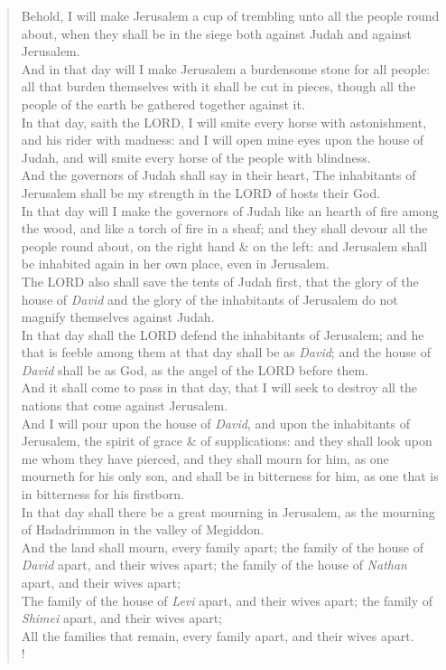 \documentclass[MAIN]{subfiles}
\begin{document}
\begin{verse}
Behold, I will make {\sc Jerusalem} a cup of trembling unto all the people round about, when they shall be in the siege both against Judah and against {\sc Jerusalem}.\\
And in that day will I make {\sc Jerusalem} a burdensome stone for all people: all that burden themselves with it shall be cut in pieces, though all the people of the earth be gathered together against it.\\
In that day, saith the {\hge LORD}, I will smite every horse with astonishment, and his rider with madness: and I will open mine eyes upon the house of Judah, and will smite every horse of the people with blindness.\\
And the governors of Judah shall say in their heart, The inhabitants of {\sc Jerusalem} shall be my strength in the {\hge LORD} of hosts their God.\\
In that day will I make the governors of Judah like an hearth of fire among the wood, and like a torch of fire in a sheaf; and they shall devour all the people round about, on the right hand \& on the left: and {\sc Jerusalem} shall be inhabited again in her own place, even in {\sc Jerusalem}.\\
The {\hge LORD} also shall save the tents of Judah first, that the glory of the house of \emph{David} and the glory of the inhabitants of {\sc Jerusalem} do not magnify themselves against Judah.\\
In that day shall the {\hge LORD} defend the inhabitants of {\sc Jerusalem}; and he that is feeble among them at that day shall be as \emph{David}; and the house of \emph{David} shall be as God, as the angel of the {\hge LORD} before them.\\
And it shall come to pass in that day, that I will seek to destroy all the nations that come against {\sc Jerusalem}.\\
And I will pour upon the house of \emph{David}, and upon the inhabitants of {\sc Jerusalem}, the spirit of grace \& of supplications: and they shall look upon me whom they have pierced, and they shall mourn for him, as one mourneth for his only son, and shall be in bitterness for him, as one that is in bitterness for his firstborn.\\
In that day shall there be a great mourning in {\sc Jerusalem}, as the mourning of {\sc Hadadrimmon} in the valley of {\sc Megiddon}.\\
And the land shall mourn, every family apart; the family of the house of \emph{David} apart, and their wives apart; the family of the house of \emph{Nathan} apart, and their wives apart;\\
The family of the house of \emph{Levi} apart, and their wives apart; the family of \emph{Shimei} apart, and their wives apart;\\
All the families that remain, every family apart, and their wives apart.\\!


\end{verse}
\end{document}
